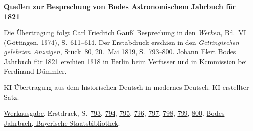 \clearpage\thispagestyle{empty}
\begin{center}\Large\bfseries Quellen zur Besprechung von Bodes Astronomischem Jahrbuch für 1821\end{center}

Die Übertragung folgt Carl Friedrich Gauß’ Besprechung in den \emph{Werken}, Bd.~VI (Göttingen, 1874), S.~611--614. Der Erstabdruck erschien in den \emph{Göttingischen gelehrten Anzeigen}, Stück~80, 20.~Mai 1819, S.~793--800. Johann Elert Bodes Jahrbuch für 1821 erschien 1818 in Berlin beim Verfasser und in Kommission bei Ferdinand Dümmler.

KI-Übertragung aus dem historischen Deutsch in modernes Deutsch. KI-erstellter Satz.

\href{https://gdz.sub.uni-goettingen.de/id/PPN236007467}{Werkausgabe}. Erstdruck, S.~\href{https://images.p.sub.uni-goettingen.de/iiif/image/gdz:PPN319721507_1819:00000797/full/1650,/0/default.jpg}{793}, \href{https://images.p.sub.uni-goettingen.de/iiif/image/gdz:PPN319721507_1819:00000798/full/1650,/0/default.jpg}{794}, \href{https://images.p.sub.uni-goettingen.de/iiif/image/gdz:PPN319721507_1819:00000799/full/1650,/0/default.jpg}{795}, \href{https://images.p.sub.uni-goettingen.de/iiif/image/gdz:PPN319721507_1819:00000800/full/1650,/0/default.jpg}{796}, \href{https://images.p.sub.uni-goettingen.de/iiif/image/gdz:PPN319721507_1819:00000801/full/1650,/0/default.jpg}{797}, \href{https://images.p.sub.uni-goettingen.de/iiif/image/gdz:PPN319721507_1819:00000802/full/1650,/0/default.jpg}{798}, \href{https://images.p.sub.uni-goettingen.de/iiif/image/gdz:PPN319721507_1819:00000803/full/1650,/0/default.jpg}{799}, \href{https://images.p.sub.uni-goettingen.de/iiif/image/gdz:PPN319721507_1819:00000804/full/1650,/0/default.jpg}{800}. \href{https://www.digitale-sammlungen.de/view/bsb10538350?page=3}{Bodes Jahrbuch, Bayerische Staatsbibliothek}.

\clearpage
